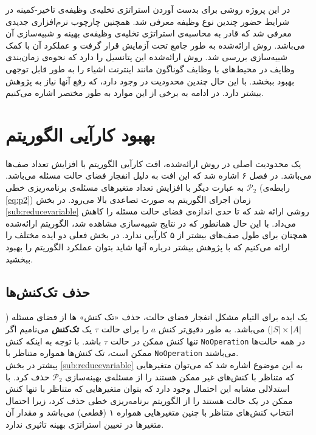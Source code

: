 در این پروژه روشی برای بدست آوردن استراتژی تخلیه‌ی وظیفه‌ی تاخیر-کمینه در شرایط حضور چندین نوع وظیفه معرفی شد. همچنین چارچوب نرم‌افزاری جدیدی معرفی شد که قادر به محاسبه‌ی استراتژی تخلیه‌ی وظیفه‌ی بهینه و شبیه‌سازی آن می‌باشد. روش ارائه‌شده به طور جامع تحت آزمایش قرار گرفت و عملکرد آن با کمک شبیه‌سازی بررسی شد. روش ارائه‌شده این پتانسیل را دارد که نحوه‌ی زمان‌بندی وظایف در محیط‌های با وظایف گوناگون مانند اینترنت اشیاء را به طور قابل توجهی بهبود ببخشد. با این حال چندین محدودیت در \CurrentProject وجود دارد، که رفع آنها نیاز به پژوهش بیشتر دارد. در ادامه به برخی از این موارد به طور مختصر اشاره می‌کنیم.

\section{بهبود کارآیی الگوریتم}
یک محدودیت اصلی در روش ارائه‌شده، افت کارآیی الگوریتم با افزایش تعداد صف‌ها می‌باشد. در فصل ۶ اشاره شد که این افت به دلیل انفجار فضای حالت مسئله می‌باشد. به عبارت دیگر با افزایش تعداد متغیرهای مسئله‌ی برنامه‌ریزی خطی
$\mathcal{P}_2$
(رابطه‌ی \ref{eq:p2}) زمان اجرای الگوریتم به صورت تصاعدی بالا می‌رود. در بخش \ref{sub:reducevariable} روشی ارائه شد که تا حدی اندازه‌ی فضای حالت مسئله را کاهش می‌داد. با این حال همانطور که در نتایج شبیه‌سازی مشاهده شد، الگوریتم ارائه‌شده همچنان برای طول صف‌های بیشتر از ۵ کارآیی ندارد. در بخش فعلی دو ایده مختلف را ارائه می‌کنیم که با پژوهش بیشتر درباره آنها شاید بتوان عملکرد الگوریتم را بهبود ببخشید.
\subsection{حذف تک‌کنش‌ها}
یک ایده‌ برای التیام مشکل انفجار فضای حالت، حذف «تک کنش» ها از فضای مسئله ($|S| \times |A|$) می‌باشد. به طور دقیق‌تر کنش $a$ را برای حالت $\tau$ یک \textbf{تک‌کنش} می‌نامیم اگر تنها کنش ممکن در حالت $\tau$ باشد. با توجه به اینکه کنش \texttt{\footnotesize NoOperation} در همه حالت‌ها ممکن است، تک کنش‌ها همواره متناظر با \texttt{\footnotesize NoOperation} می‌باشند. \\

پیشتر در بخش \ref{sub:reducevariable} به این موضوع اشاره شد که می‌توان متغیرهایی که متناظر با کنش‌های غیر ممکن هستند را از مسئله‌ی بهینه‌سازی 
 $\mathcal{P}_2$
 حذف کرد. با استدلالی مشابه این احتمال وجود دارد که بتوان متغیرهایی که متناظر با تنها کنش ممکن در یک حالت هستند را از الگوریتم برنامه‌ریزی خطی حذف کرد، زیرا احتمال انتخاب کنش‌های متناظر با چنین متغیرهایی همواره ۱ (قطعی) می‌باشد و مقدار آن متغیرها در تعیین استراتژی بهینه تاثیری ندارد. \\ 
 
